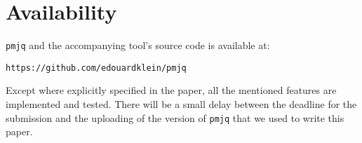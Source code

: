 \documentclass[letterpaper,twocolumn,10pt]{article}
\begin{document}
\section{Availability}
\label{sec:code}
{\tt pmjq} and the accompanying tool's source code is available at:

\begin{center}
{\tt https://github.com/edouardklein/pmjq }\\
\end{center}

Except where explicitly specified in the paper, all the mentioned features are implemented and tested. There will be a small delay between the deadline for the submission and the uploading of the version of {\tt pmjq} that we used to write this paper.

{\footnotesize 
}


\theendnotes
\end{document}
